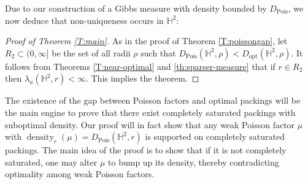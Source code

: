 \documentclass[11pt]{amsart}
\theoremstyle{definition}
\theoremstyle{remark}
\renewcommand{\H}{\mathbb{H}}
\newcommand{\density}{\operatorname{density}}
\newcommand{\opt}{\operatorname{opt}}
\newcommand{\Pois}{\operatorname{Pois}}
\newcommand{\Dopt}{D_{\opt}}
\begin{document}
Due to our construction of a Gibbs measure with density bounded by $D_{\Pois}$, we now deduce that non-uniqueness occurs in $\H^2$:

\begin{proof}[Proof of Theorem \ref{T:main}]
    As in the proof of Theorem \ref{T:poissongap}, let $R_2 \subset (0,\infty]$ be the set of all radii $\rho$ such that $D_{\Pois}(\H^2,\rho)<\Dopt(\H^2,\rho)$. It follows from Theorems \ref{T:near-optimal} and \ref{th:sparser-measure} that if 
$r \in R_2$ then $\lambda_u(\H^2,r)<\infty$. This implies the theorem.
\end{proof}

The existence of the gap between Poisson factors and optimal packings will be the main engine to prove that there exist completely saturated packings with suboptimal density.  Our proof will in fact show that any weak Poisson factor $\mu$ with $\density_r(\mu) = D_{\Pois}(\H^2,r)$ is supported on completely saturated packings.  The main idea of the proof is to show that if it is not completely saturated, one may alter $\mu$ to bump up its density, thereby contradicting optimality among weak Poisson factors.
\end{document}
